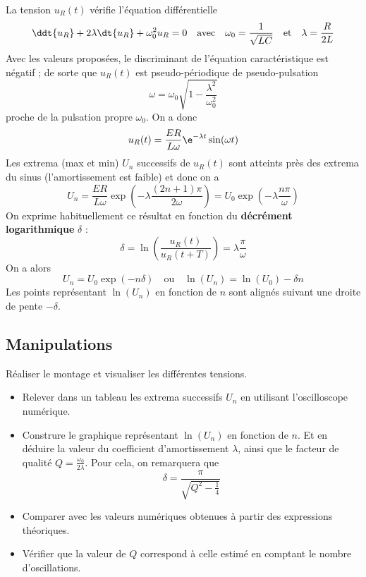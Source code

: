 \documentclass{tp}
\begin{document}
La tension $u_R(t)$ vérifie l'équation différentielle
\begin{equation}
  \ddt{u_R} + 2\lambda \dt{u_R} + \omega_0^2u_R = 0 \quad \text{avec} \quad \omega_0 = \frac{1}{\sqrt{LC}} \quad \text{et}\quad \lambda=\frac{R}{2L}
\end{equation}
Avec les valeurs proposées, le discriminant de l'équation caractéristique est négatif ; de sorte que $u_R(t)$ est pseudo-périodique de pseudo-pulsation 
\begin{equation}
  \omega = \omega_0\sqrt{1-\frac{\lambda^2}{\omega_0^2}}
\end{equation}
proche de la pulsation propre $\omega_0$. On a donc 
\begin{equation}
  u_R(t) = \frac{ER}{L\omega}\e^{-\lambda t}\sin(\omega t)
\end{equation}
Les extrema (max et min) $U_n$ successifs de $u_R(t)$ sont atteints près des extrema du sinus (l'amortissement est faible) et donc on a 
\begin{equation}
  U_n = \frac{ER}{L\omega}\exp\left( -\lambda\frac{(2n+1)\pi}{2\omega} \right) = U_0\exp\left( -\lambda\frac{n\pi}{\omega} \right)  
\end{equation}
On exprime habituellement ce résultat en fonction du \textbf{décrément logarithmique} $\delta$ :
\begin{equation}
  \delta = \ln\left( \frac{u_R(t)}{u_R(t+T)} \right)  = \lambda\frac{\pi}{\omega}
\end{equation}
On a alors 
\begin{equation}
  U_n = U_0\exp\left(-n\delta\right) \quad \text{ou} \quad \ln(U_n)=\ln(U_0)-\delta n
\end{equation}
Les points représentant $\ln(U_n)$ en fonction de $n$ sont alignés suivant une droite de pente $-\delta$. 

\subsection{Manipulations}%
\label{sub:manipulations}

Réaliser le montage et visualiser les différentes tensions. 
\begin{itemize}
  \item Relever dans un tableau les extrema successifs $U_n$ en utilisant l'oscilloscope numérique.

  \item Construre le graphique représentant $\ln(U_n)$ en fonction de $n$. Et en déduire la valeur du coefficient d'amortissement $\lambda$, ainsi que le facteur de qualité $Q=\frac{\omega_0}{2\lambda}$. Pour cela, on remarquera que 
  \begin{equation}
    \delta = \frac{\pi}{\sqrt{Q^2-\frac{1}{4}}}
  \end{equation}
  
  \item Comparer avec les valeurs numériques obtenues à partir des expressions théoriques.

  \item Vérifier que la valeur de $Q$ correspond à celle estimé en comptant le nombre d'oscillations.
\end{itemize}
\end{document}
